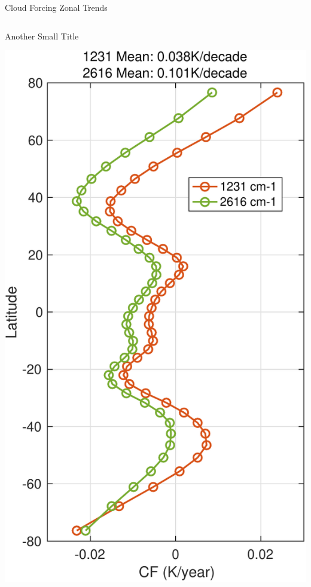 \documentclass[10pt,t]{beamer}
\begin{document}
\begin{frame}[label={sec:org9a39960}]{Cloud Forcing Zonal Trends}
\begin{columns}
\begin{column}{0.33\columnwidth}
\begin{block}{\footnotesize Another Small Title}
\vspace{-0.1in}
\begin{center}
\includegraphics[width=\linewidth]{./Figs/Pdf/new_trend_rand_stats_1231_and_2161_era_clr_minus_obs_smoothed_with_2616_labelled.pdf}
\end{center}
\end{block}
\end{column}
\end{columns}
\end{frame}
\end{document}
